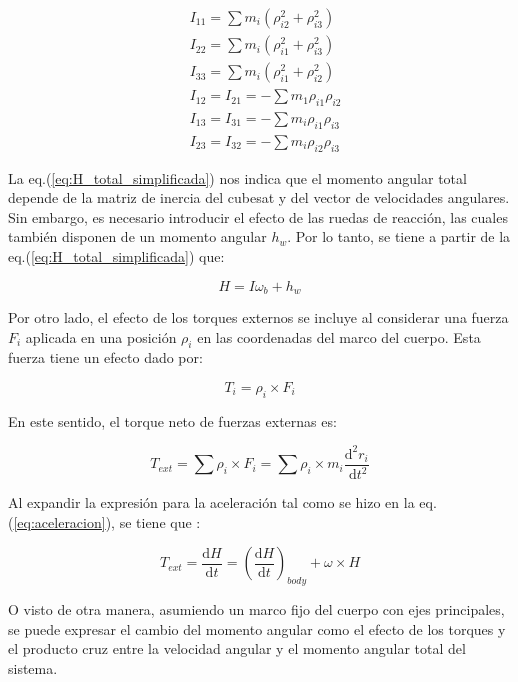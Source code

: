  $$
 \begin{aligned}
 	& I_{11}=\sum m_i\left(\rho_{i 2}^2+\rho_{i 3}^2\right) \\
 	& I_{22}=\sum m_i\left(\rho_{i 1}^2+\rho_{i 3}^2\right) \\
 	& I_{33}=\sum m_i\left(\rho_{i 1}^2+\rho_{i 2}^2\right) \\
 	& I_{12}=I_{21}=-\sum m_1 \rho_{i 1} \rho_{i 2} \\
 	& I_{13}=I_{31}=-\sum m_i \rho_{i 1} \rho_{i 3} \\
 	& I_{23}=I_{32}=-\sum m_i \rho_{i 2} \rho_{i 3}
 \end{aligned}
 $$
 
 La eq.(\ref{eq:H_total_simplificada}) nos indica que el momento angular total depende de la matriz de inercia del cubesat y del vector de velocidades angulares. Sin embargo, es necesario introducir el efecto de las ruedas de reacción, las cuales también disponen de un momento angular $h_w$. Por lo tanto, se tiene a partir de la eq.(\ref{eq:H_total_simplificada}) que: 
 
 \begin{equation}\label{eq:H_total_RW}
 	H = I\omega_b + h_w
 \end{equation}
 
 Por otro lado, el efecto de los torques externos se incluye al considerar una fuerza $F_i$ aplicada en una posición $\rho_i$ en las coordenadas del marco del cuerpo. Esta fuerza tiene un efecto dado por: 
  
 \begin{equation}
 	T_i=\rho_i \times F_i  
 \end{equation}
 
 
En este sentido, el torque neto de fuerzas externas es:

\begin{equation}
	T_{ext}=\sum \rho_i \times F_i=\sum \rho_i \times m_i \frac{\mathrm{d}^2 r_i}{\mathrm{~d} t^2} 	
\end{equation}
 
 
 Al expandir la expresión para la aceleración tal como se hizo en la eq.(\ref{eq:aceleracion}), se tiene que :
 
 \begin{equation}
 	T_{ext}= \frac{\mathrm{d} H}{\mathrm{d} t} = \left(\frac{\mathrm{d} H}{\mathrm{d} t}\right)_{body} + \omega \times H 	
 \end{equation}
 
 O visto de otra manera, asumiendo un marco fijo del cuerpo con ejes principales, se puede expresar el cambio del momento angular como el efecto de los torques y el producto cruz entre la velocidad angular y el momento angular total del sistema.
 
